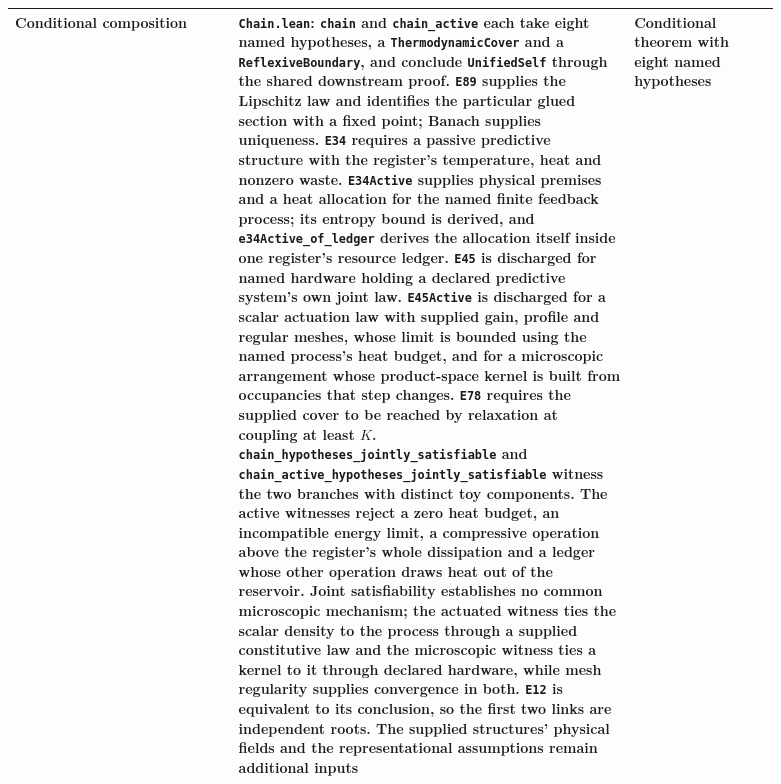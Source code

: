 \documentclass{article}
\begin{document}
\begin{longtable}{|>{\raggedright\arraybackslash}p{0.26\linewidth}|>{\raggedright\arraybackslash}p{0.46\linewidth}|>{\raggedright\arraybackslash}p{0.17\linewidth}|}
Conditional composition & \texttt{Chain.lean}: \texttt{chain} and \texttt{chain\_active} each take eight named hypotheses, a \texttt{ThermodynamicCover} and a \texttt{ReflexiveBoundary}, and conclude \texttt{UnifiedSelf} through the shared downstream proof. \texttt{E89} supplies the Lipschitz law and identifies the particular glued section with a fixed point; Banach supplies uniqueness. \texttt{E34} requires a passive predictive structure with the register's temperature, heat and nonzero waste. \texttt{E34Active} supplies physical premises and a heat allocation for the named finite feedback process; its entropy bound is derived, and \nolinkurl{e34Active_of_ledger} derives the allocation itself inside one register's resource ledger. \texttt{E45} is discharged for named hardware holding a declared predictive system's own joint law. \texttt{E45Active} is discharged for a scalar actuation law with supplied gain, profile and regular meshes, whose limit is bounded using the named process's heat budget, and for a microscopic arrangement whose product-space kernel is built from occupancies that step changes. \texttt{E78} requires the supplied cover to be reached by relaxation at coupling at least $K$. \texttt{chain\_hypotheses\_jointly\_satisfiable} and \nolinkurl{chain_active_hypotheses_jointly_satisfiable} witness the two branches with distinct toy components. The active witnesses reject a zero heat budget, an incompatible energy limit, a compressive operation above the register's whole dissipation and a ledger whose other operation draws heat out of the reservoir. Joint satisfiability establishes no common microscopic mechanism; the actuated witness ties the scalar density to the process through a supplied constitutive law and the microscopic witness ties a kernel to it through declared hardware, while mesh regularity supplies convergence in both. \texttt{E12} is equivalent to its conclusion, so the first two links are independent roots. The supplied structures' physical fields and the representational assumptions remain additional inputs & Conditional theorem with eight named hypotheses \\ \hline

\end{longtable}
\end{document}
